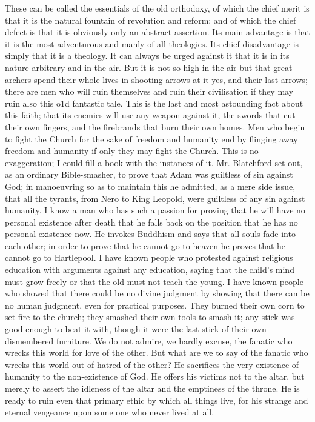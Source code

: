 \documentclass{book}
\begin{document}
These can be called the essentials of the old orthodoxy, of which the chief merit is that it is the natural fountain of revolution and reform; and of which the chief defect is that it is obviously only an abstract assertion. Its main advantage is that it is the most adventurous and manly of all theologies. Its chief disadvantage is simply that it is a theology. It can always be urged against it that it is in its nature arbitrary and in the air. But it is not so high in the air but that great archers spend their whole lives in shooting arrows at it-yes, and their last arrows; there are men who will ruin themselves and ruin their civilisation if they may ruin also this o1d fantastic tale. This is the last and most astounding fact about this faith; that its enemies will use any weapon against it, the swords that cut their own fingers, and the firebrands that burn their own homes. Men who begin to fight the Church for the sake of freedom and humanity end by flinging away freedom and humanity if only they may fight the Church. This is no exaggeration; I could fill a book with the instances of it. Mr. Blatchford set out, as an ordinary Bible-smasher, to prove that Adam was guiltless of sin against God; in manoeuvring so as to maintain this he admitted, as a mere side issue, that all the tyrants, from Nero to King Leopold, were guiltless of any sin against humanity. I know a man who has such a passion for proving that he will have no personal existence after death that he falls back on the position that he has no personal existence now. He invokes Buddhism and says that all souls fade into each other; in order to prove that he cannot go to heaven he proves that he cannot go to Hartlepool. I have known people who protested against religious education with arguments against any education, saying that the child’s mind must grow freely or that the old must not teach the young. I have known people who showed that there could be no divine judgment by showing that there can be no human judgment, even for practical purposes. They burned their own corn to set fire to the church; they smashed their own tools to smash it; any stick was good enough to beat it with, though it were the last stick of their own dismembered furniture. We do not admire, we hardly excuse, the fanatic who wrecks this world for love of the other. But what are we to say of the fanatic who wrecks this world out of hatred of the other? He sacrifices the very existence of humanity to the non-existence of God. He offers his victims not to the altar, but merely to assert the idleness of the altar and the emptiness of the throne. He is ready to ruin even that primary ethic by which all things live, for his strange and eternal vengeance upon some one who never lived at all.
\end{document}
